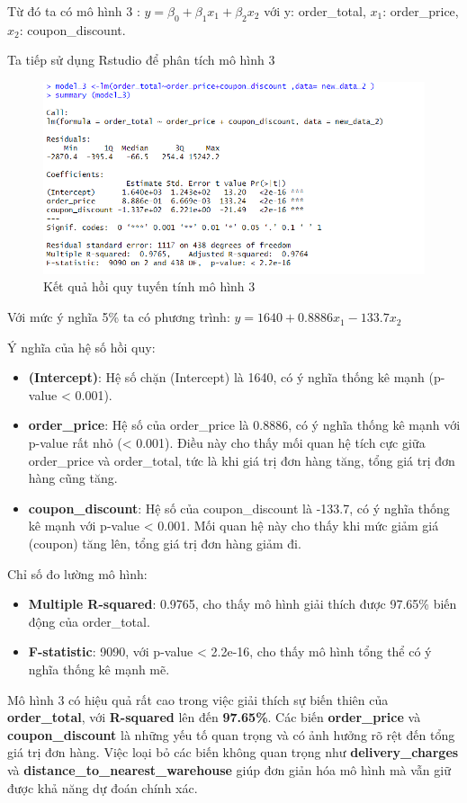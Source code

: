 Từ đó ta có mô hình 3 : $y= \beta_0 + \beta_1x_1 + \beta_2x_2$ với y: order\_total, $x_1$: order\_price, $x_2$: coupon\_discount.

Ta tiếp sử dụng Rstudio để phân tích mô hình 3
\begin{figure}[H]
  \centering
  \includegraphics[width=0.7\linewidth]{graphics/5.5.4.png}
  \caption{Kết quả hồi quy tuyến tính mô hình 3 }
\end{figure}

Với mức ý nghĩa 5\% ta có phương trình: $y= 1640 + 0.8886x_1 - 133.7 x_2$

Ý nghĩa của hệ số hồi quy:
\begin{itemize}
\item\textbf{(Intercept)}: Hệ số chặn (Intercept) là 1640, có ý nghĩa thống kê mạnh (p-value < 0.001).
\item\textbf{order\_price}: Hệ số của order\_price là 0.8886, có ý nghĩa thống kê mạnh với p-value rất nhỏ (< 0.001). Điều này cho thấy mối quan hệ tích cực giữa order\_price và order\_total, tức là khi giá trị đơn hàng tăng, tổng giá trị đơn hàng cũng tăng.
\item\textbf{coupon\_discount}: Hệ số của coupon\_discount là -133.7, có ý nghĩa thống kê mạnh với p-value < 0.001. Mối quan hệ này cho thấy khi mức giảm giá (coupon) tăng lên, tổng giá trị đơn hàng giảm đi.
\end{itemize}

Chỉ số đo lường mô hình:

\begin{itemize}
\item\textbf{Multiple R-squared}: 0.9765, cho thấy mô hình giải thích được 97.65\% biến động của order\_total.
\item\textbf{F-statistic}: 9090, với p-value < 2.2e-16, cho thấy mô hình tổng thể có ý nghĩa thống kê mạnh mẽ.
\end{itemize}

Mô hình 3 có hiệu quả rất cao trong việc giải thích sự biến thiên của \textbf{order\_total}, với \textbf{R-squared} lên đến \textbf{97.65\%}. Các biến \textbf{order\_price} và \textbf{coupon\_discount} là những yếu tố quan trọng và có ảnh hưởng rõ rệt đến tổng giá trị đơn hàng. Việc loại bỏ các biến không quan trọng như \textbf{delivery\_charges} và \textbf{distance\_to\_nearest\_warehouse} giúp đơn giản hóa mô hình mà vẫn giữ được khả năng dự đoán chính xác.


